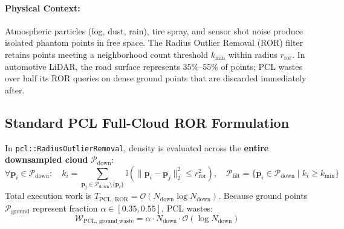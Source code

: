 \documentclass[11pt,a4paper]{article}
\begin{document}
\paragraph{Physical Context:} Atmospheric particles (fog, dust, rain), tire spray, and sensor shot noise produce isolated phantom points in free space. The Radius Outlier Removal (ROR) filter retains points meeting a neighborhood count threshold $k_{\min}$ within radius $r_{\text{ror}}$. In automotive LiDAR, the road surface represents $35\%\text{--}55\%$ of points; PCL wastes over half its ROR queries on dense ground points that are discarded immediately after.

\subsection{Standard PCL Full-Cloud ROR Formulation}
In \texttt{pcl::RadiusOutlierRemoval}, density is evaluated across the \textbf{entire downsampled cloud} $\mathcal{P}_{\text{down}}$:
\begin{equation}
\forall \bm{p}_i \in \mathcal{P}_{\text{down}}: \quad k_i = \sum_{\bm{p}_j \in \mathcal{P}_{\text{down}} \setminus \{\bm{p}_i\}} \mathbb{I}\left( \|\bm{p}_i - \bm{p}_j\|_2^2 \le r_{\text{ror}}^2 \right), \quad \mathcal{P}_{\text{filt}} = \big\{ \bm{p}_i \in \mathcal{P}_{\text{down}} \;\big|\; k_i \ge k_{\min} \big\}
\label{eq:pcl_ror_math}
\end{equation}
Total execution work is $T_{\text{PCL, ROR}} = \mathcal{O}(N_{\text{down}} \log N_{\text{down}})$. Because ground points $\mathcal{P}_{\text{ground}}$ represent fraction $\alpha \in [0.35, 0.55]$, PCL wastes:
\begin{equation}
\mathcal{W}_{\text{PCL, ground\_waste}} = \alpha \cdot N_{\text{down}} \cdot \mathcal{O}(\log N_{\text{down}})
\end{equation}
\end{document}
